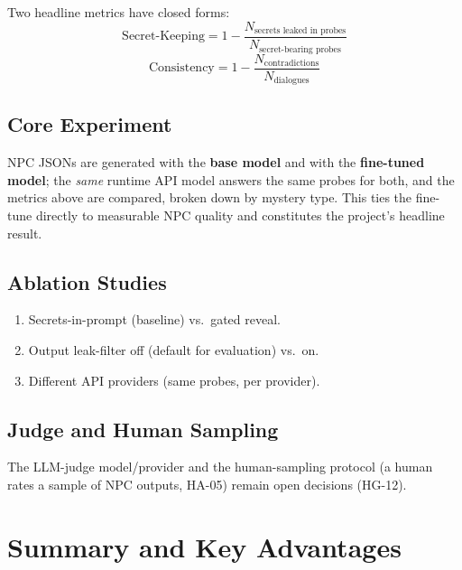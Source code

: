 \documentclass[11pt,a4paper]{article}
\begin{document}
Two headline metrics have closed forms:
\begin{equation}
    \text{Secret-Keeping} = 1 - \frac{N_{\text{secrets leaked in probes}}}{N_{\text{secret-bearing probes}}}
\end{equation}
\begin{equation}
    \text{Consistency} = 1 - \frac{N_{\text{contradictions}}}{N_{\text{dialogues}}}
\end{equation}

\subsection{Core Experiment}
NPC JSONs are generated with the \textbf{base model} and with the \textbf{fine-tuned model}; the \emph{same} runtime API model answers the same probes for both, and the metrics above are compared, broken down by mystery type. This ties the fine-tune directly to measurable NPC quality and constitutes the project's headline result.

\subsection{Ablation Studies}
\begin{enumerate}
    \item Secrets-in-prompt (baseline) vs.\ gated reveal.
    \item Output leak-filter off (default for evaluation) vs.\ on.
    \item Different API providers (same probes, per provider).
\end{enumerate}

\subsection{Judge and Human Sampling}
The LLM-judge model/provider and the human-sampling protocol (a human rates a sample of NPC outputs, HA-05) remain open decisions (HG-12).

\section{Summary and Key Advantages}
\end{document}
